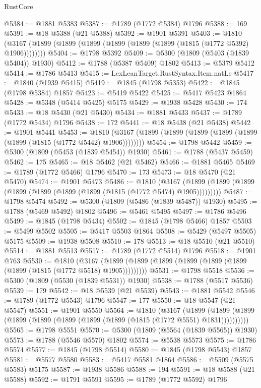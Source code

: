 \begin{lexlean}{RustCore}
\begin{coremodule}
@5384 := @1881 @5383
@5387 := @1789 (@1772 @5384) @1796
@5388 := 169
@5391 := @18 @5388 (@21 @5388)
@5392 := @1901 @5391
@5403 := @1810 (@3167 (@1899 (@1899 (@1899 (@1899 (@1899 (@1899 (@1815 (@1772 @5392) @1906))))))))
@5404 := @1798 @5392
@5409 := @5300 (@1809 (@5403 (@1839 @5404)) @1930)
@5412 := @1788 (@5387 @5409) @1802
@5413 := @5379 @5412
@5414 := @1786 @5413
@5415 := LexLeanTarget.RustSyntax.Item.natLe
@5417 := @1840 (@1939 @5415)
@5419 := @1845 (@1798 @5353)
@5422 := @1845 (@1798 @5384) @1857
@5423 := @5419 @5422
@5425 := @5417 @5423 @1864
@5428 := @5348 (@5414 @5425) @5175
@5429 := @1938 @5428
@5430 := 174
@5433 := @18 @5430 (@21 @5430)
@5434 := @1881 @5433
@5437 := @1789 (@1772 @5434) @1796
@5438 := 172
@5441 := @18 @5438 (@21 @5438)
@5442 := @1901 @5441
@5453 := @1810 (@3167 (@1899 (@1899 (@1899 (@1899 (@1899 (@1899 (@1815 (@1772 @5442) @1906))))))))
@5454 := @1798 @5442
@5459 := @5300 (@1809 (@5453 (@1839 @5454)) @1930)
@5461 := @1788 (@5437 @5459)
@5462 := 175
@5465 := @18 @5462 (@21 @5462)
@5466 := @1881 @5465
@5469 := @1789 (@1772 @5466) @1796
@5470 := 173
@5473 := @18 @5470 (@21 @5470)
@5474 := @1901 @5473
@5486 := @1810
    (@3167 (@1899 (@1899 (@1899 (@1899 (@1899 (@1899 (@1899 (@1815 (@1772 @5474) @1905)))))))))
@5487 := @1798 @5474
@5492 := @5300 (@1809 (@5486 (@1839 @5487)) @1930)
@5495 := @1788 (@5469 @5492) @1802
@5496 := @5461 @5495
@5497 := @1786 @5496
@5499 := @1845 (@1798 @5434)
@5502 := @1845 (@1798 @5466) @1857
@5503 := @5499 @5502
@5505 := @5417 @5503 @1864
@5508 := @5429 (@5497 @5505) @5175
@5509 := @1938 @5508
@5510 := 178
@5513 := @18 @5510 (@21 @5510)
@5514 := @1881 @5513
@5517 := @1789 (@1772 @5514) @1796
@5518 := @1901 @763
@5530 := @1810
    (@3167 (@1899 (@1899 (@1899 (@1899 (@1899 (@1899 (@1899 (@1815 (@1772 @5518) @1905)))))))))
@5531 := @1798 @5518
@5536 := @5300 (@1809 (@5530 (@1839 @5531)) @1930)
@5538 := @1788 (@5517 @5536)
@5539 := 179
@5542 := @18 @5539 (@21 @5539)
@5543 := @1881 @5542
@5546 := @1789 (@1772 @5543) @1796
@5547 := 177
@5550 := @18 @5547 (@21 @5547)
@5551 := @1901 @5550
@5564 := @1810
    (@3167
      (@1899 (@1899 (@1899 (@1899 (@1899 (@1899 (@1899 (@1899 (@1815 (@1772 @5551) @1831))))))))))
@5565 := @1798 @5551
@5570 := @5300 (@1809 (@5564 (@1839 @5565)) @1930)
@5573 := @1788 (@5546 @5570) @1802
@5574 := @5538 @5573
@5575 := @1786 @5574
@5577 := @1845 (@1798 @5514)
@5580 := @1845 (@1798 @5543) @1857
@5581 := @5577 @5580
@5583 := @5417 @5581 @1864
@5586 := @5509 (@5575 @5583) @5175
@5587 := @1938 @5586
@5588 := 194
@5591 := @18 @5588 (@21 @5588)
@5592 := @1791 @5591
@5595 := @1789 (@1772 @5592) @1796

\end{coremodule}
\end{lexlean}
